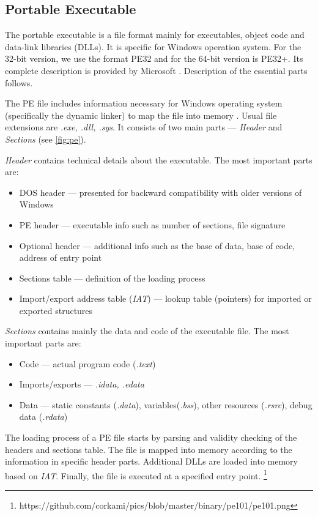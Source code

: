 \subsection{Portable Executable}
The portable executable is a file format mainly for executables, object code and data-link libraries (DLLs). It is specific for Windows operation system. For the 32-bit version, we use the format PE32 and for the 64-bit version is PE32+. Its complete description is provided by Microsoft \cite{PEFormat89:online}. Description of the essential parts follows.

The PE file includes information necessary for Windows operating system (specifically the dynamic linker) to map the file into memory \cite{Gibert2020}. Usual file extensions are \emph{.exe, .dll, .sys}. It consists of two main parts --- \emph{Header} and \emph{Sections} (see \ref{fig:pe}). 

\emph{Header} contains technical details about the executable. The most important parts are:
\begin{itemize}
  \itemsep0em 
  \item DOS header --- presented for backward compatibility with older versions of Windows
  \item PE header --- executable info such as number of sections, file signature
  \item Optional header --- additional info such as the base of data, base of code, address of entry point
  \item Sections table --- definition of the loading process
  \item Import/export address table (\emph{IAT}) --- lookup table (pointers) for imported or exported structures
\end{itemize}

\emph{Sections} contains mainly the data and code of the executable file. The most important parts are:
\begin{itemize}
  \itemsep0em 
  \item Code --- actual program code (\emph{.text})
  \item Imports/exports --- \emph{.idata, .edata}
  \item Data --- static constants (\emph{.data}), variables(\emph{.bss}), other resources (\emph{.rsrc}), debug data (\emph{.rdata})
\end{itemize}

The loading process of a PE file starts by parsing and validity checking of the headers and sections table. The file is mapped into memory according to the information in specific header parts. Additional DLLs are loaded into memory based on \emph{IAT}. Finally, the file is executed at a specified entry point. \footnote{https://github.com/corkami/pics/blob/master/binary/pe101/pe101.png}

